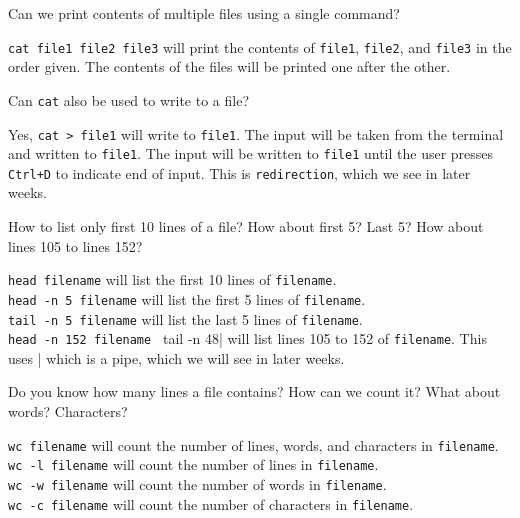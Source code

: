 
\begin{qs}
  Can we print contents of multiple files using a single command?
\end{qs}

\begin{ans}
  \lstinline|cat file1 file2 file3| will print the contents of \lstinline|file1|, \lstinline|file2|, and \lstinline|file3|
  in the order given. The contents of the files will be printed one after the other.
\end{ans}

\begin{qs}
  Can \lstinline|cat| also be used to write to a file?
\end{qs}

\begin{ans}
  Yes, \lstinline|cat > file1| will write to \lstinline|file1|. The input will be taken from the
  terminal and written to \lstinline|file1|. The input will be written to \lstinline|file1| until
  the user presses \lstinline|Ctrl+D| to indicate end of input.
  This is \lstinline|redirection|, which we see in later weeks.
\end{ans}

\begin{qs}
  How to list only first 10 lines of a file? How about first 5? Last 5?
  How about lines 105 to lines 152?
\end{qs}

\begin{ans}
  \lstinline|head filename| will list the first 10 lines of \lstinline|filename|. \\
  \lstinline|head -n 5 filename| will list the first 5 lines of \lstinline|filename|. \\
  \lstinline|tail -n 5 filename| will list the last 5 lines of \lstinline|filename|. \\
  \lstinline|head -n 152 filename | tail -n 48| will list lines 105 to 152 of \lstinline|filename|.
  This uses \lstinline||| which is a pipe, which we will see in later weeks.
\end{ans}

\begin{qs}
  Do you know how many lines a file contains? How can we count it?
  What about words? Characters?
\end{qs}

\begin{ans}
  \lstinline|wc filename| will count the number of lines, words, and characters in \lstinline|filename|. \\
  \lstinline|wc -l filename| will count the number of lines in \lstinline|filename|. \\
  \lstinline|wc -w filename| will count the number of words in \lstinline|filename|. \\
  \lstinline|wc -c filename| will count the number of characters in \lstinline|filename|.
\end{ans}

